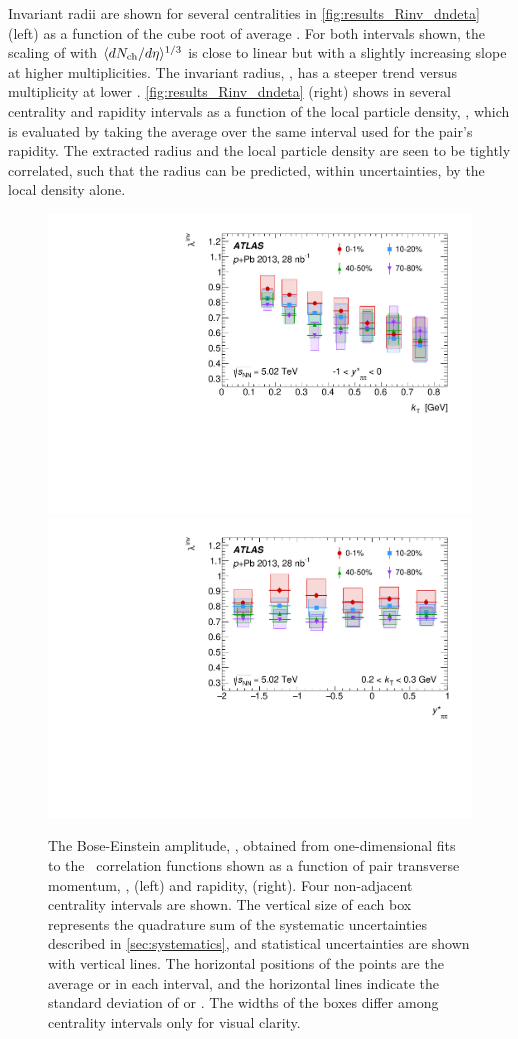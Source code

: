 Invariant radii are shown for several centralities in \cref{fig:results_Rinv_dndeta} (left) as a function of the cube root of average \dNdeta. 
For both \kt intervals shown, the scaling of \Rinv with $\langle d\mbox{$N_{\mathrm{ch}}$}/d\eta\rangle^{1/3}$ is close to linear but with a slightly increasing slope at higher multiplicities.
The invariant radius, \Rinv, has a steeper trend versus multiplicity at lower \kt.
\cref{fig:results_Rinv_dndeta} (right) shows \Rinv in several centrality and rapidity intervals as a function of the local particle density, \dNdy, which is evaluated by taking the average over the same interval used for the pair's rapidity.
The extracted radius and the local particle density are seen to be tightly correlated, such that the radius can be predicted, within uncertainties, by the local density alone.

\begin{figure}[t]
\centering
\includegraphics[width=0.49\linewidth]{canqinv_x_vs_kt.pdf}
\includegraphics[width=0.49\linewidth]{canqinv_x_vs_kys.pdf}
\caption{The Bose-Einstein amplitude, \linv, obtained from one-dimensional fits to the \qinv\ correlation functions shown as a function of pair transverse momentum, \kt, (left) and rapidity, \kys (right). Four non-adjacent centrality intervals are shown. The vertical size of each box represents the quadrature sum of the systematic uncertainties described in \cref{sec:systematics}, and statistical uncertainties are shown with vertical lines. The horizontal positions of the points are the average \kt or \kys in each interval, and the horizontal lines indicate the standard deviation of \kt or \kys. The widths of the boxes differ among centrality intervals only for visual clarity.}
\label{fig:results_qinv_x}
\end{figure}

